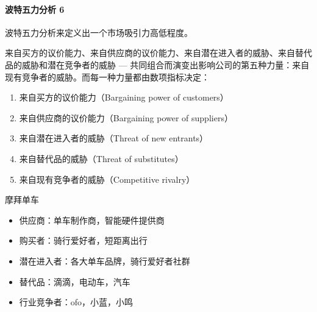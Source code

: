 \documentclass[letterpaper,11pt,english]{sphinxmanual}
\begin{document}
\paragraph{波特五力分析 6\sphinxfootnotemark[421]}
\label{\detokenize{chapter_knowledge/BRD:id16}}%
\begin{footnotetext}[421]\sphinxAtStartFootnote
{}
%
\end{footnotetext}\ignorespaces 
波特五力分析来定义出一个市场吸引力高低程度。

来自买方的议价能力、来自供应商的议价能力、来自潜在进入者的威胁、来自替代品的威胁和潜在竞争者的威胁
—
共同组合而演变出影响公司的第五种力量：来自现有竞争者的威胁。而每一种力量都由数项指标决定：
\begin{enumerate}
%
\item {} 
来自买方的议价能力（Bargaining power of customers）

\item {} 
来自供应商的议价能力（Bargaining power of suppliers）

\item {} 
来自潜在进入者的威胁（Threat of new entrants）

\item {} 
来自替代品的威胁（Threat of substitutes）

\item {} 
来自现有竞争者的威胁（Competitive rivalry）

\end{enumerate}

摩拜单车
\begin{itemize}
\item {} 
供应商：单车制作商，智能硬件提供商

\item {} 
购买者：骑行爱好者，短距离出行

\item {} 
潜在进入者：各大单车品牌，骑行爱好者社群

\item {} 
替代品：滴滴，电动车，汽车

\item {} 
行业竞争者：ofo，小蓝，小鸣%
\begin{footnote}[422]\sphinxAtStartFootnote
{}
%
\end{footnote}

\end{itemize}
\end{document}
